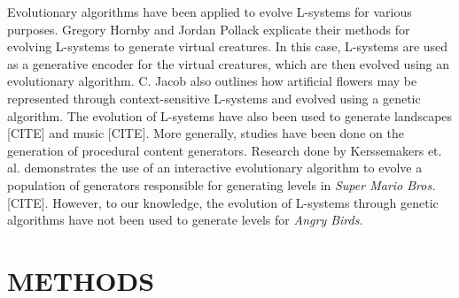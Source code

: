 \documentclass[letterpaper, 10 pt, conference]{ieeeconf}
\begin{document}
Evolutionary algorithms have been applied to evolve L-systems for various purposes. Gregory Hornby and Jordan Pollack explicate their methods for evolving L-systems to generate virtual creatures. In this case, L-systems are used as a generative encoder for the virtual creatures, which are then evolved using an evolutionary algorithm. C. Jacob also outlines how artificial flowers may be represented through context-sensitive L-systems and evolved using a genetic algorithm. The evolution of L-systems have also been used to generate landscapes [CITE] and music [CITE]. More generally, studies have been done on the generation of procedural content generators. Research done by Kerssemakers et. al. demonstrates the use of an interactive evolutionary algorithm to evolve a population of generators responsible for generating levels in \textit{Super Mario Bros.} [CITE]. However, to our knowledge, the evolution of L-systems through genetic algorithms have not been used to generate levels for \textit{Angry Birds}.
\section{METHODS}
\end{document}
